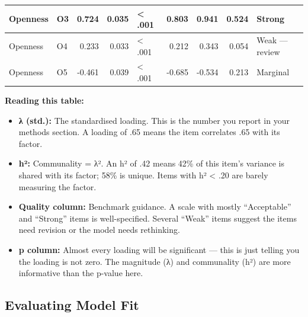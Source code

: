 \documentclass[
]{article}
\providecommand{\tightlist}{%
  \setlength{\itemsep}{0pt}\setlength{\parskip}{0pt}}
\begin{document}
\begin{table}
\begin{tabular}[t]{l|l|r|r|l|r|r|>{}r|l}
\hline
\hspace{1em}Openness & O3 & 0.724 & 0.035 & < .001 & 0.803 & 0.941 & \textcolor[HTML]{27AE60}{0.524} & Strong\\
\hline
\hspace{1em}Openness & O4 & 0.233 & 0.033 & < .001 & 0.212 & 0.343 & \textcolor[HTML]{C0392B}{0.054} & Weak — review\\
\hline
\hspace{1em}Openness & O5 & -0.461 & 0.039 & < .001 & -0.685 & -0.534 & \textcolor[HTML]{C0392B}{0.213} & Marginal\\
\hline
\end{tabular}
\end{table}

\textbf{Reading this table:}

\begin{itemize}
\tightlist
\item
  \textbf{λ (std.):} The standardised loading. This is the number you
  report in your methods section. A loading of .65 means the item
  correlates .65 with its factor.
\item
  \textbf{h²:} Communality = λ². An h² of .42 means 42\% of this item's
  variance is shared with its factor; 58\% is unique. Items with h²
  \textless{} .20 are barely measuring the factor.
\item
  \textbf{Quality column:} Benchmark guidance. A scale with mostly
  ``Acceptable'' and ``Strong'' items is well-specified. Several
  ``Weak'' items suggest the items need revision or the model needs
  rethinking.
\item
  \textbf{p column:} Almost every loading will be significant --- this
  is just telling you the loading is not zero. The magnitude (λ) and
  communality (h²) are more informative than the p-value here.
\end{itemize}

\subsection{Evaluating Model Fit}\label{evaluating-model-fit}
\end{document}
